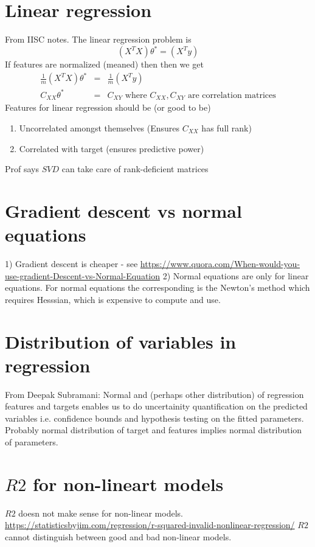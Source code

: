 \documentclass{article}
\newcommand{\beq}{\begin{equation}}
\newcommand{\eeq}{\end{equation}}
\newcommand{\ber}{\begin{eqnarray}}
\newcommand{\eer}{\end{eqnarray}}
\begin{document}
\section{Linear regression}
From IISC notes. The linear regression problem is
\beq
(X^TX)\theta^{*} = (X^Ty) 
\eeq
If features are normalized (meaned) then then we get
\ber
\frac{1}{m}(X^TX)\theta^{*} &=& \frac{1}{m}(X^Ty)  \\
C_{XX}\theta^{*} &=& C_{XY} \text{    where $C_{XX},C_{XY}$ are correlation matrices}
\eer
Features for linear regression should be (or good to be)
\begin{enumerate}
\item{Uncorrelated amongst themselves (Ensures $C_{XX}$ has full rank)}
\item{Correlated with target (ensures predictive power)}  
\end{enumerate}
Prof says $SVD$ can take care of rank-deficient matrices
%
%
%
\section{Gradient descent vs normal equations}
1) Gradient descent is cheaper - see \url{https://www.quora.com/When-would-you-use-gradient-Descent-vs-Normal-Equation}
2) Normal equations are only for linear equations. For normal equations the corresponding is the Newton's method which requires Hesssian, which is expensive to compute and use.
%
%
%
\section{Distribution of variables in regression}
From Deepak Subramani: Normal and (perhaps other distribution) of regression features and targets enables us to do uncertainity quantification on the predicted variables i.e. confidence bounds and hypothesis testing on the fitted parameters. Probably normal distribution of target and features implies normal distribution of parameters.

\section{$R2$ for non-lineart models}
$R2$ doesn not make sense for non-linear models.
\url{https://statisticsbyjim.com/regression/r-squared-invalid-nonlinear-regression/} $R2$ cannot distinguish between good and bad non-linear models.
\end{document}
